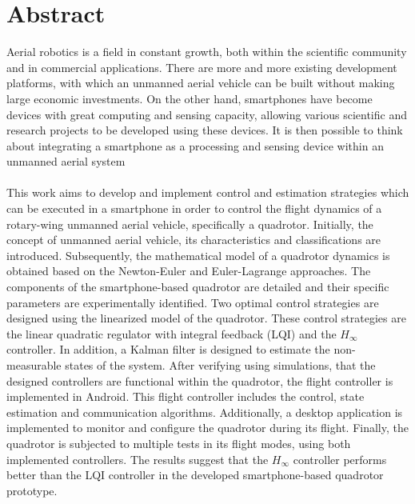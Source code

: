 \chapter*{Abstract} \label{abstract}
\setcounter{page}{5} 
Aerial robotics is a field in constant growth, both within the scientific community and in commercial applications. There are more and more existing development platforms, with which an unmanned aerial vehicle can be built without making large economic investments. On the other hand, smartphones have become devices with great computing and sensing capacity, allowing various scientific and research projects to be developed using these devices. It is then possible to think about integrating a smartphone as a processing and sensing device within an unmanned aerial system
\\\\
This work aims to develop and implement control and estimation strategies which can be executed in a smartphone in order to control the flight dynamics of a rotary-wing unmanned aerial vehicle, specifically a quadrotor. Initially, the concept of unmanned aerial vehicle, its characteristics and classifications are introduced. Subsequently, the mathematical model of a quadrotor dynamics is obtained based on the Newton-Euler and Euler-Lagrange approaches. The components of the smartphone-based quadrotor are detailed and their specific parameters are experimentally identified. Two optimal control strategies are designed using the linearized model of the quadrotor. These control strategies are the linear quadratic regulator with integral feedback (LQI) and the $H_\infty$ controller. In addition, a Kalman filter is designed to estimate the non-measurable states of the system. After verifying using simulations, that the designed controllers are functional within the quadrotor, the flight controller is implemented in Android. This flight controller includes the control, state estimation and communication algorithms. Additionally, a desktop application is implemented to monitor and configure the quadrotor during its flight. Finally, the quadrotor is subjected to multiple tests in its flight modes, using both implemented controllers. The results suggest that the $H_\infty$ controller performs better than the LQI controller in the developed smartphone-based quadrotor prototype.
\\\\

